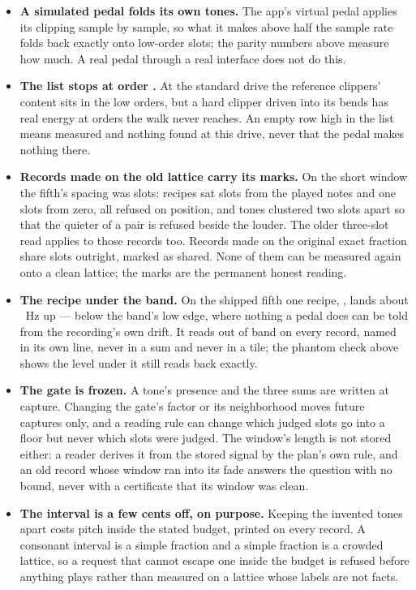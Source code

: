 \documentclass[11pt,a4paper]{article}
\begin{document}
\begin{itemize}
  lift that does not fall with distance is broadband noise.
  \item \textbf{A simulated pedal folds its own tones.} The app's virtual
  pedal applies its clipping sample by sample, so what it makes above
  half the sample rate folds back exactly onto low-order slots; the
  parity numbers above measure how much. A real pedal through a real
  interface does not do this.
  \item \textbf{The list stops at order \imdMaxOrder{}.} At the standard
  drive the reference clippers' content sits in the low orders, but a
  hard clipper driven into its bends has real energy at orders the walk
  never reaches. An empty row high in the list means measured and
  nothing found at this drive, never that the pedal makes nothing there.
  \item \textbf{Records made on the old lattice carry its marks.} On the
  short window the fifth's spacing was \imdCorpusSpacing{} slots:
  \imdCorpusNearNoteCount{} recipes sat \imdCorpusNearNoteOffset{} slots
  from the played notes and one \imdCorpusNearDCOffset{} slots from zero,
  all refused on position, and tones clustered two slots apart so that
  the quieter of a pair is refused beside the louder. The older
  three-slot read applies to those records too. Records made on the
  original exact fraction share slots outright, marked as shared. None of
  them can be measured again onto a clean lattice; the marks are the
  permanent honest reading.
  \item \textbf{The recipe under the band.} On the shipped fifth one
  recipe, \imdSubBandRecipe{}, lands about \imdSubBandHz{}~Hz up --- below
  the band's low edge, where nothing a pedal does can be told from the
  recording's own drift. It reads out of band on every record, named in
  its own line, never in a sum and never in a tile; the phantom check
  above shows the level under it still reads back exactly.
  \item \textbf{The gate is frozen.} A tone's presence and the three sums
  are written at capture. Changing the gate's factor or its neighborhood
  moves future captures only, and a reading rule can change which
  judged slots go into a floor but never which slots were judged. The
  window's length is not stored either: a reader derives it from the
  stored signal by the plan's own rule, and an old record whose window
  ran into its fade answers the question with no bound, never with a
  certificate that its window was clean.
  \item \textbf{The interval is a few cents off, on purpose.} Keeping the
  invented tones apart costs pitch inside the stated budget, printed on
  every record. A consonant interval is a simple fraction and a simple
  fraction is a crowded lattice, so a request that cannot escape one
  inside the budget is refused before anything plays rather than measured
  on a lattice whose labels are not facts.
\end{itemize}
\end{document}
